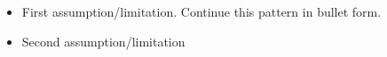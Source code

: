 
    
\begin{itemize}
\item First assumption/limitation. Continue this pattern in bullet form.
\item Second assumption/limitation
\end{itemize}